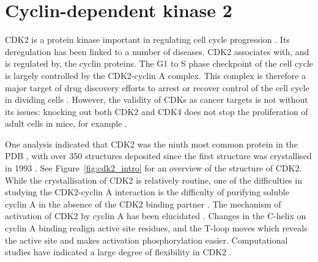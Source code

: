 \section{Cyclin-dependent kinase 2}
\label{sec:introduction_cdk2}

CDK2 is a protein kinase important in regulating cell cycle progression \cite{Peyressatre2015}.
Its deregulation has been linked to a number of diseases.
CDK2 associates with, and is regulated by, the cyclin proteins.
The G1 to S phase checkpoint of the cell cycle is largely controlled by the CDK2-cyclin A complex.
This complex is therefore a major target of drug discovery efforts to arrest or recover control of the cell cycle in dividing cells \cite{Betzi2011}.
However, the validity of CDKs as cancer targets is not without its issues: knocking out both CDK2 and CDK4 does not stop the proliferation of adult cells in mice, for example \cite{Barriere2007}.

One analysis indicated that CDK2 was the ninth most common protein in the PDB \cite{Berman2013}, with over 350 structures deposited since the first structure was crystallised in 1993 \cite{DeBondt1993}.
See Figure~\ref{fig:cdk2_intro} for an overview of the structure of CDK2.
While the crystallisation of CDK2 is relatively routine, one of the difficulties in studying the CDK2-cyclin A interaction is the difficulty of purifying soluble cyclin A in the absence of the CDK2 binding partner \cite{Grigoroudis2015}.
The mechanism of activation of CDK2 by cyclin A has been elucidated \cite{Jeffrey1995, Russo1996, Morris2002}.
Changes in the \textalpha C-helix on cyclin A binding realign active site residues, and the T-loop moves which reveals the active site and makes activation phosphorylation easier.
Computational studies have indicated a large degree of flexibility in CDK2 \cite{Pisani2016, Gu2007}.


